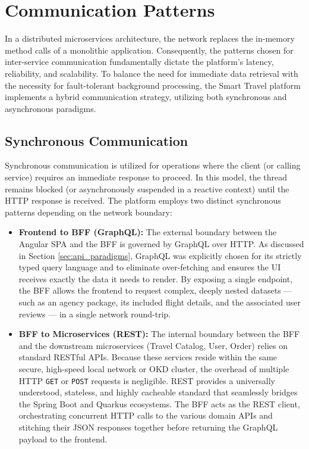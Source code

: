 
\section{Communication Patterns}
\label{sec:communication_patterns}

In a distributed microservices architecture, the network replaces the in-memory method calls of a monolithic application. Consequently, the patterns chosen for inter-service communication fundamentally dictate the platform's latency, reliability, and scalability. To balance the need for immediate data retrieval with the necessity for fault-tolerant background processing, the Smart Travel platform implements a hybrid communication strategy, utilizing both synchronous and asynchronous paradigms.

\subsection{Synchronous Communication}

Synchronous communication is utilized for operations where the client (or calling service) requires an immediate response to proceed. In this model, the thread remains blocked (or asynchronously suspended in a reactive context) until the HTTP response is received. The platform employs two distinct synchronous patterns depending on the network boundary:

\begin{itemize}
    \item \textbf{Frontend to BFF (GraphQL):} The external boundary between the Angular \gls{SPA} and the \gls{BFF} is governed by GraphQL over HTTP. As discussed in Section \ref{sec:api_paradigms}, GraphQL was explicitly chosen for its strictly typed query language and to eliminate over-fetching and ensures the \gls{UI} receives exactly the data it needs to render. By exposing a single endpoint, the BFF allows the frontend to request complex, deeply nested datasets — such as an agency package, its included flight details, and the associated user reviews — in a single network round-trip. 
    
    \item \textbf{BFF to Microservices (REST):} The internal boundary between the BFF and the downstream microservices (Travel Catalog, User, Order) relies on standard RESTful APIs. Because these services reside within the same secure, high-speed local network or OKD cluster, the overhead of multiple HTTP \texttt{GET} or \texttt{POST} requests is negligible. REST provides a universally understood, stateless, and highly cacheable standard that seamlessly bridges the Spring Boot and Quarkus ecosystems. The BFF acts as the REST client, orchestrating concurrent HTTP calls to the various domain APIs and stitching their JSON responses together before returning the GraphQL payload to the frontend.
\end{itemize}

